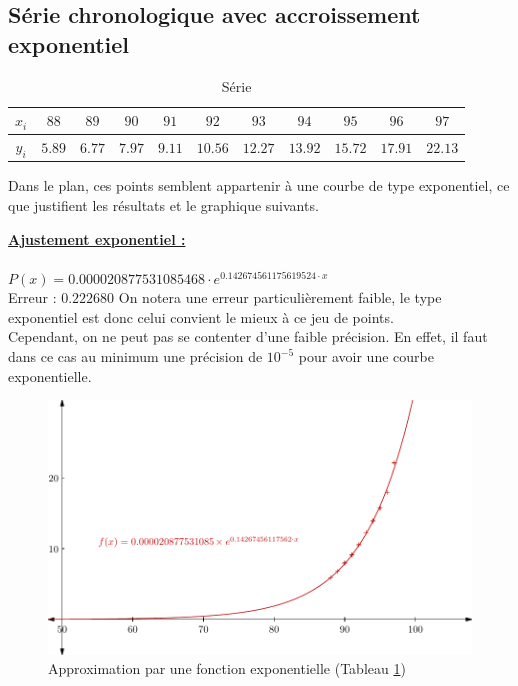 \documentclass{report}
\begin{document}
      \newpage
      \subsection{Série chronologique avec accroissement exponentiel}
	\begin{table}[h]
	  \centering
	  \begin{tabular}{| c | c | c | c | c | c | c | c | c | c | c |}
	    \hline 
	    $x_{i}$ & $88$ & $89$ & $90$ & $91$ & $92$ & $93$ & $94$ & $95$ & $96$ & $97$ \\ 
	    \hline 
	    $y_{i}$ & $5.89$ & $6.77$ & $7.97$ & $9.11$ & $10.56$ & $12.27$ & $13.92$ & $15.72$ & $17.91$ & $22.13$ \\ 
	    \hline 
	  \end{tabular}
	  \caption{Série}
	  \label{approx_tp2_ex4}
	\end{table}
	
	Dans le plan, ces points semblent appartenir à une courbe de type exponentiel, ce que justifient les résultats et le graphique suivants.
	
	\noindent\underline{\textbf{Ajustement exponentiel :}}\\ \\
	$P(x) = 0.000020877531085468\cdot e^{0.142674561175619524\cdot x}$\\
	Erreur : $0.222680$
	\newline
	On notera une erreur particulièrement faible, le type exponentiel est donc celui convient le mieux à ce jeu de points. \\
	Cependant, on ne peut pas se contenter d'une faible précision. En effet, il faut dans ce cas au minimum une précision de $10^{-5}$ pour avoir une courbe exponentielle.
	\newline
	\begin{figure}[h]
	  \centering
	  \includegraphics[scale=0.75]{graphiques/pdf_output/reglin_tp2_ex4.pdf}
	  \caption{Approximation par une fonction exponentielle (Tableau \ref{approx_tp2_ex4})}
        \end{figure}
      
\end{document}
